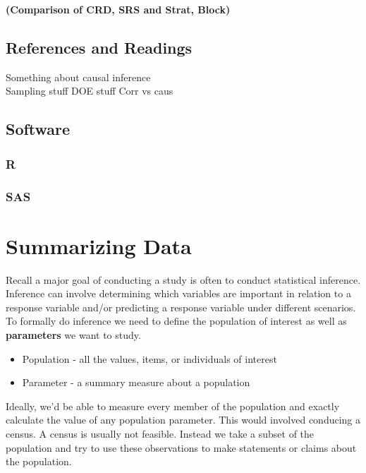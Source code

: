 \documentclass[
]{book}
\theoremstyle{definition}
\theoremstyle{definition}
\theoremstyle{definition}
\theoremstyle{remark}
\begin{document}
\textbf{(Comparison of CRD, SRS and Strat, Block)}

\hypertarget{references-and-readings}{%
\section{References and Readings}\label{references-and-readings}}

Something about causal inference\\
Sampling stuff
DOE stuff
Corr vs caus

\hypertarget{software-1}{%
\section{Software}\label{software-1}}

\hypertarget{r-1}{%
\subsection{R}\label{r-1}}

\hypertarget{sas-1}{%
\subsection{SAS}\label{sas-1}}

\hypertarget{summarizing-data}{%
\chapter{Summarizing Data}\label{summarizing-data}}

Recall a major goal of conducting a study is often to conduct statistical inference. Inference can involve determining which variables are important in relation to a response variable and/or predicting a response variable under different scenarios. To formally do inference we need to define the population of interest as well as \textbf{parameters} we want to study.

\begin{itemize}
\item
  Population - all the values, items, or individuals of interest
\item
  Parameter - a summary measure about a population
\end{itemize}

Ideally, we'd be able to measure every member of the population and exactly calculate the value of any population parameter. This would involved conducing a census. A census is usually not feasible. Instead we take a subset of the population and try to use these observations to make statements or claims about the population.
\end{document}
